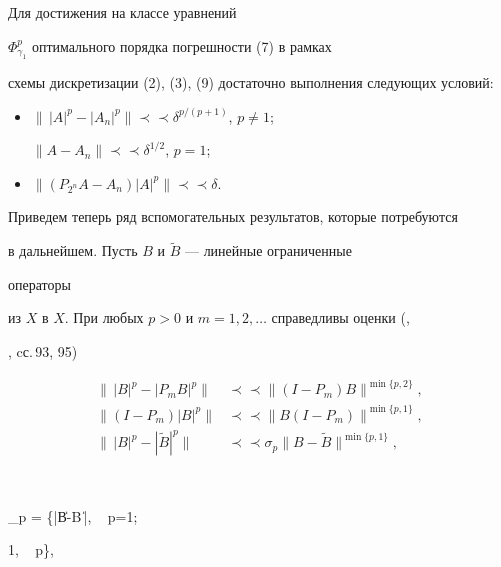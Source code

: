 \begin{cornonum} Для достижения на классе уравнений


$\Phi_{\gamma_1}^p$ оптимального порядка погрешности (7) в рамках


схемы дискретизации (2), (3), (9) достаточно выполнения следующих условий:


\begin{itemize}


\item[(i)] $\|\,|A|^p -|A_n|^p\| \prec\prec


\delta^{p/(p+1)}$, $p\ne 1$;


$\|A-A_n\| \prec\prec \delta^{1/2}$, $p=1$;


\item[(ii)] $\|(P_{2^n}A-A_n)|A|^p\| \prec\prec \delta$.


\end{itemize}


\end{cornonum}





Приведем теперь ряд вспомогательных результатов, которые потребуются


в дальнейшем. Пусть $B$ и ${\widetilde B}$ --- линейные ограниченные


операторы


из $X$ в $X$. При любых $p>0$ и $m=1,2,\dotsc$ справедливы оценки (\cite{PV},


\cite{VV}, cс.\,93, 95)


\begin{align}


\|\,|B|^p-|P_m B|^p\| &\prec\prec


\|(I-P_m)B\|^{\min\{p,2\}}, \\


%


\|(I-P_m)|B|^p\| & \prec\prec


\|B(I-P_m)\|^{\min\{p,1\}}, \\


%


\|\,|B|^p-|{\tilde B}|^p\| &\prec\prec


\sigma_p\|B-{\tilde B}\|^{\min\{p,1\}},


\end{align}


$$


\sigma_p = \{|\ln \|B-{\widetilde B}\|\,|, \ \; p=1; \quad


1, \ \; p\},


